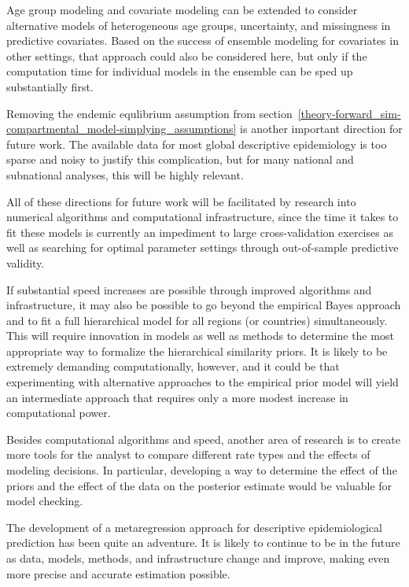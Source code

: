Age group modeling and covariate modeling can be extended to consider
alternative models of heterogeneous age groups, uncertainty, and
missingness in predictive covariates.  Based on the success of
ensemble modeling for covariates in other settings, that approach
could also be considered here, but only if the computation time for
individual models in the ensemble can be sped up substantially first.

Removing the endemic equlibrium assumption from
section~\ref{theory-forward_sim-compartmental_model-simplying_assumptions}
is another important direction for future work.  The available data
for most global descriptive epidemiology is too sparse and noisy to justify
this complication, but for many national and subnational analyses,
this will be highly relevant.


All of these directions for future work will be facilitated by
research into numerical algorithms and computational infrastructure,
since the time it takes to fit these models is currently an impediment
to large cross-validation exercises as well as searching for optimal
parameter settings through out-of-sample predictive validity.

If substantial speed increases are possible through improved algorithms and
infrastructure, it may also be possible to go beyond the empirical Bayes
approach and to fit a full hierarchical model for all regions (or
countries) simultaneously.  This will require innovation in models as
well as methods to determine the most appropriate way to formalize the
hierarchical similarity priors.  It is likely to be extremely
demanding computationally, however, and it could be that experimenting
with alternative approaches to the empirical prior model will yield an
intermediate approach that requires only a more modest increase in
computational power.





Besides computational algorithms and speed, another area of research
is to create more tools for the analyst to compare different rate
types and the effects of modeling decisions.  In particular,
developing a way to determine the effect of the priors and the effect
of the data on the posterior estimate would be valuable for model
checking.

The development of a metaregression approach for descriptive
epidemiological prediction has been quite an adventure.  It is likely
to continue to be in the future as data, models, methods, and
infrastructure change and improve, making even more precise and
accurate estimation possible.
